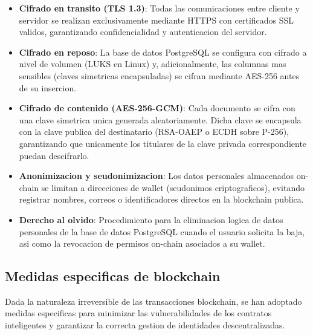 \documentclass[11pt, a4paper]{article}
\begin{document}
\begin{itemize}
    \item \textbf{Cifrado en transito (TLS 1.3)}: Todas las comunicaciones entre cliente y servidor se realizan exclusivamente mediante HTTPS con certificados SSL validos, garantizando confidencialidad y autenticacion del servidor.
    \item \textbf{Cifrado en reposo}: La base de datos PostgreSQL se configura con cifrado a nivel de volumen (LUKS en Linux) y, adicionalmente, las columnas mas sensibles (claves simetricas encapsuladas) se cifran mediante AES-256 antes de su insercion.
    \item \textbf{Cifrado de contenido (AES-256-GCM)}: Cada documento se cifra con una clave simetrica unica generada aleatoriamente. Dicha clave se encapsula con la clave publica del destinatario (RSA-OAEP o ECDH sobre P-256), garantizando que unicamente los titulares de la clave privada correspondiente puedan descifrarlo.
    \item \textbf{Anonimizacion y seudonimizacion}: Los datos personales almacenados on-chain se limitan a direcciones de wallet (seudonimos criptograficos), evitando registrar nombres, correos o identificadores directos en la blockchain publica.
    \item \textbf{Derecho al olvido}: Procedimiento para la eliminacion logica de datos personales de la base de datos PostgreSQL cuando el usuario solicita la baja, asi como la revocacion de permisos on-chain asociados a su wallet.
\end{itemize}

\subsection{Medidas especificas de blockchain}

Dada la naturaleza irreversible de las transacciones blockchain, se han adoptado medidas especificas para minimizar las vulnerabilidades de los contratos inteligentes y garantizar la correcta gestion de identidades descentralizadas.
\end{document}
